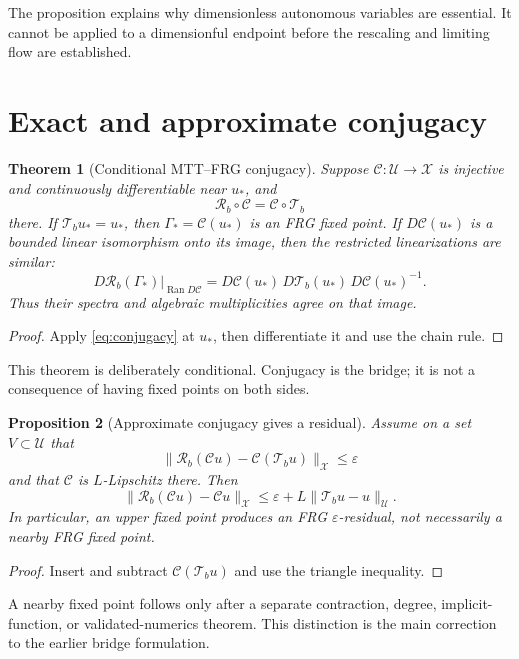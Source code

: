 \documentclass[11pt]{article}
\newtheorem{theorem}{Theorem}[section]
\newtheorem{proposition}[theorem]{Proposition}
\theoremstyle{definition}
\theoremstyle{remark}
\newcommand{\X}{\mathcal X}
\newcommand{\U}{\mathcal U}
\newcommand{\Rmap}{\mathcal R}
\newcommand{\Tmap}{\mathcal T}
\newcommand{\Cmap}{\mathcal C}
\newcommand{\Ran}{\operatorname{Ran}}
\begin{document}
The proposition explains why dimensionless autonomous variables are
essential. It cannot be applied to a dimensionful endpoint before the
rescaling and limiting flow are established.

\section{Exact and approximate conjugacy}

\begin{theorem}[Conditional MTT--FRG conjugacy]
\label{thm:conjugacy}
Suppose \(\Cmap:\U\to\X\) is injective and continuously differentiable near
\(u_\ast\), and
\begin{equation}
 \Rmap_b\circ\Cmap=\Cmap\circ\Tmap_b
 \label{eq:conjugacy}
\end{equation}
there. If \(\Tmap_bu_\ast=u_\ast\), then
\(\Gamma_\ast=\Cmap(u_\ast)\) is an FRG fixed point. If \(D\Cmap(u_\ast)\)
is a bounded linear isomorphism onto its image, then the restricted
linearizations are similar:
\[
 D\Rmap_b(\Gamma_\ast)|_{\Ran D\Cmap}
 =
 D\Cmap(u_\ast)\,D\Tmap_b(u_\ast)\,
 D\Cmap(u_\ast)^{-1}.
\]
Thus their spectra and algebraic multiplicities agree on that image.
\end{theorem}

\begin{proof}
Apply \eqref{eq:conjugacy} at \(u_\ast\), then differentiate it and use the
chain rule.
\end{proof}

This theorem is deliberately conditional. Conjugacy is the bridge; it is
not a consequence of having fixed points on both sides.

\begin{proposition}[Approximate conjugacy gives a residual]
\label{prop:approx-conjugacy}
Assume on a set \(V\subset\U\) that
\[
 \|\Rmap_b(\Cmap u)-\Cmap(\Tmap_bu)\|_{\X}\leq\varepsilon
\]
and that \(\Cmap\) is \(L\)-Lipschitz there. Then
\[
 \|\Rmap_b(\Cmap u)-\Cmap u\|_{\X}
 \leq \varepsilon+L\|\Tmap_bu-u\|_{\U}.
\]
In particular, an upper fixed point produces an FRG
\(\varepsilon\)-residual, not necessarily a nearby FRG fixed point.
\end{proposition}

\begin{proof}
Insert and subtract \(\Cmap(\Tmap_bu)\) and use the triangle inequality.
\end{proof}

A nearby fixed point follows only after a separate contraction, degree,
implicit-function, or validated-numerics theorem. This distinction is the
main correction to the earlier bridge formulation.
\end{document}
